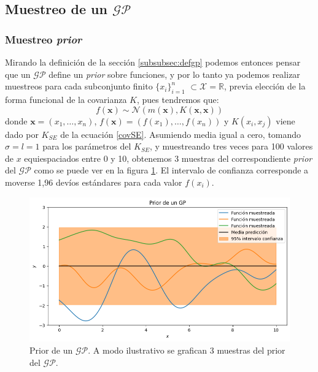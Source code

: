 \documentclass[a4paper]{article}
\newcommand{\gp}{\ensuremath{\mathcal{GP}}}
\begin{document}
\subsection{Muestreo de un $\gp$}
\label{subsec:muestreoGP}

\subsubsection{Muestreo \emph{prior}}
Mirando la definición de la sección \ref{subsubsec:defgp} podemos entonces pensar que un $\gp$ define un \emph{prior} sobre funciones, y por lo tanto ya podemos realizar muestreos para cada subconjunto finito $\{x_i\}_{i=1}^n$ $\subset \mathcal{X}=\mathbb{R}$, previa elección de la forma funcional de la covarianza $K$, pues tendremos que:
$$ 	f(\mathbf{x}) \sim \mathcal{N}(m(\mathbf{x}), K(\mathbf{x},\mathbf{x})) $$
donde $\mathbf{x}=(x_1,\dots,x_n)$, $f(\mathbf{x}) = (f(x_1),\dots,f(x_n))$ y $K(x_i,x_j)$ viene dado por $K_{SE}$ de la ecuación \ref{covSE}. Asumiendo media igual a cero, tomando $\sigma=l=1$ para los parámetros del $K_{SE}$, y muestreando tres veces para 100 valores de $x$ equiespaciados entre 0 y 10, obtenemos 3 muestras del correspondiente \emph{prior} del $\gp$ como se puede ver en la figura \ref{fig:gprior}. El intervalo de confianza corresponde a moverse 1,96 devíos estándares para cada valor $f(x_i)$.
\begin{figure}[H]
	\centering
	\includegraphics[trim={0cm 0cm 0cm 0cm},clip,width=\textwidth]{gpprior.png}
	\caption{Prior de un $\gp$. A modo ilustrativo se grafican 3 muestras del prior del $\gp$.}
	\label{fig:gprior}
\end{figure}
\end{document}
